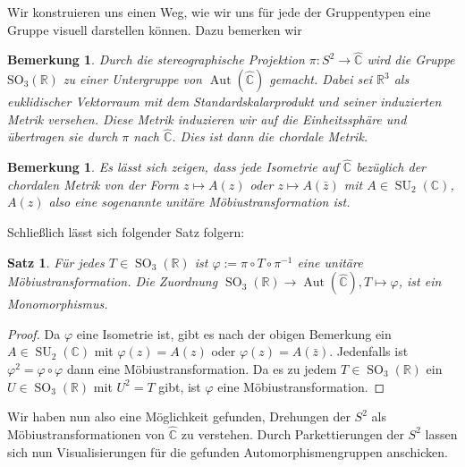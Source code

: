 \documentclass[12pt,a4paper]{article}
\theoremstyle{plain}
\newtheorem{Satz}[Theorem]{Satz}
\newtheorem{Bemerkung}[Theorem]{Bemerkung}
\newcommand{\R}{\mathbb{R}}
\newcommand{\C}{\mathbb{C}}
\newcommand{\Ch}{\hat{\C}}
\numberwithin{equation}{section}
\begin{document}
Wir konstruieren uns einen Weg, wie wir uns für jede der Gruppentypen eine Gruppe visuell darstellen können. Dazu bemerken wir
\begin{Bemerkung} Durch die stereographische Projektion $\pi:S^2\rightarrow \Ch$ wird die Gruppe $\operatorname{SO_3(\R)}$ zu einer Untergruppe von $\operatorname{Aut}(\Ch)$ gemacht. Dabei sei $\R^3$ als euklidischer Vektorraum mit dem Standardskalarprodukt und seiner induzierten Metrik versehen. Diese Metrik induzieren wir auf die Einheitssphäre und übertragen sie durch $\pi$ nach $\Ch$. Dies ist dann die \emph{chordale Metrik}.
\end{Bemerkung}
\begin{Bemerkung}
Es lässt sich zeigen, dass jede Isometrie auf $\Ch$ bezüglich der chordalen Metrik von der Form $z\mapsto A(z)$ oder $z\mapsto A(\bar{z})$ mit $A\in \operatorname{SU}_2(\C)$, $A(z)$ also eine sogenannte \emph{unitäre} Möbiustransformation ist.
\end{Bemerkung}
Schließlich lässt sich folgender Satz folgern:
\begin{Satz}
Für jedes $T\in\operatorname{SO}_3(\R)$ ist $\varphi:=\pi\circ T\circ\pi^{-1}$ eine unitäre Möbiustransformation. Die Zuordnung $\operatorname{SO}_3(\R) \rightarrow \operatorname{Aut}(\Ch), T\mapsto \varphi$, ist ein Monomorphismus.
\end{Satz}
\begin{proof}
Da $\varphi$ eine Isometrie ist, gibt es nach der obigen Bemerkung ein $A\in\operatorname{SU}_2(\C)$ mit $\varphi(z) = A(z)$ oder $\varphi(z)=A(\bar{z})$. Jedenfalls ist $\varphi^2 = \varphi\circ\varphi$ dann eine Möbiustransformation. Da es zu jedem $T\in\operatorname{SO}_3(\R)$ ein $U\in\operatorname{SO}_3(\R)$ mit $U^2=T$ gibt, ist $\varphi$ eine Möbiustransformation.
\end{proof}
Wir haben nun also eine Möglichkeit gefunden, Drehungen der $S^2$ als Möbius\-trans\-for\-ma\-tio\-nen von $\Ch$ zu verstehen. 
Durch Parkettierungen der $S^2$ lassen sich nun Visualisierungen für die gefunden Automorphismengruppen anschicken.
\end{document}
